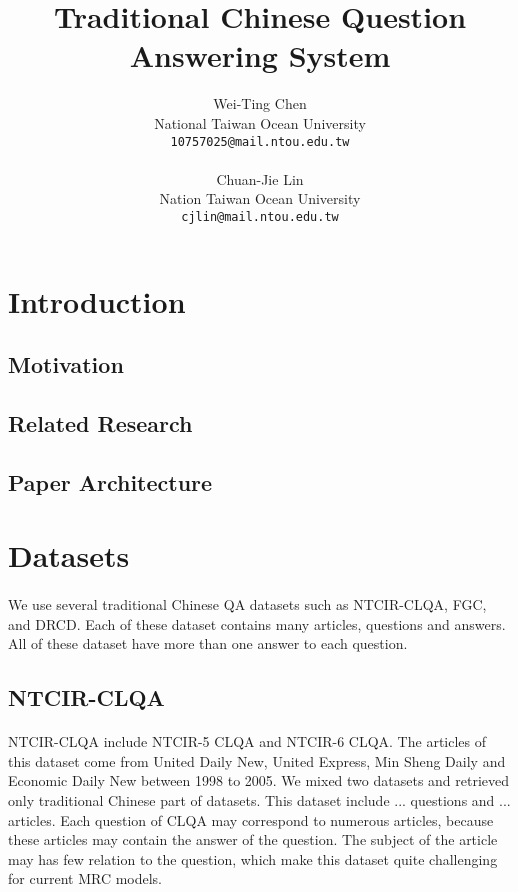\documentclass[12pt]{article}
\title{Traditional Chinese Question Answering System}
\author{
  Wei-Ting Chen\\
  National Taiwan Ocean University\\
  \texttt{10757025@mail.ntou.edu.tw}\\
  \\
  Chuan-Jie Lin\\
  Nation Taiwan Ocean University\\
  \texttt{cjlin@mail.ntou.edu.tw}\\
}
\begin{document}
\maketitle
{}
\newpage
{}
\doublespacing
\tableofcontents
\singlespacing
\newpage

\section{Introduction}

\subsection{Motivation}

\subsection{Related Research}

\subsection{Paper Architecture}

\section{Datasets}
\paragraph{}
We use several traditional Chinese QA datasets such as NTCIR-CLQA, FGC, and DRCD\cite{shao2018drcd}. Each of these dataset contains many articles, questions and answers. All of these dataset have more than one answer to each question.

\subsection{NTCIR-CLQA}
\paragraph{}
NTCIR-CLQA include NTCIR-5 CLQA and NTCIR-6 CLQA. The articles of this dataset come from United Daily New, United Express, Min Sheng Daily and Economic Daily New between 1998 to 2005. We mixed two datasets and retrieved only traditional Chinese part of datasets. This dataset include ... questions and ... articles. Each question of CLQA may correspond to numerous articles, because these articles may contain the answer of the question. The subject of the article may has few relation to the question, which make this dataset quite challenging for current MRC models.
\end{document}
